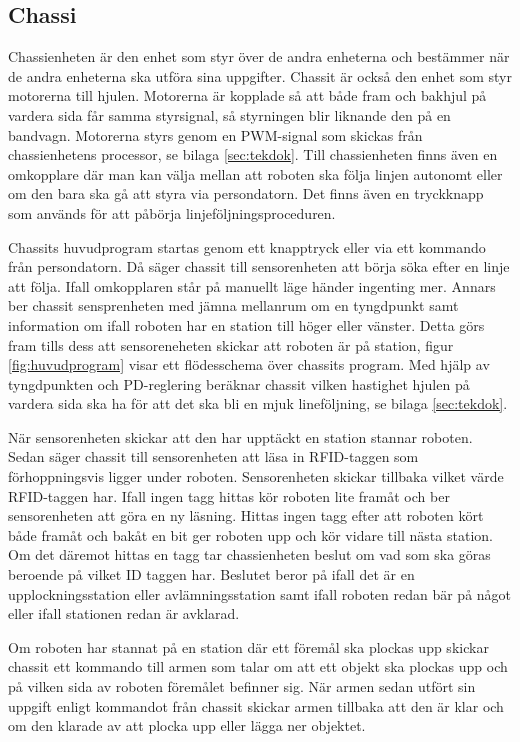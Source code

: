 
\subsection{Chassi}

Chassienheten är den enhet som styr över de andra enheterna och bestämmer när de andra enheterna ska utföra sina uppgifter. Chassit är också den enhet som styr motorerna till hjulen. Motorerna är kopplade så att både fram och bakhjul på vardera sida får samma styrsignal, så styrningen blir liknande den på en bandvagn. Motorerna styrs genom en PWM-signal som skickas från chassienhetens processor, se bilaga \ref{sec:tekdok}. Till chassienheten finns även en omkopplare där man kan välja mellan att roboten ska följa linjen autonomt eller om den bara ska gå att styra via persondatorn. Det finns även en tryckknapp som används för att påbörja linjeföljningsproceduren.

Chassits huvudprogram startas genom ett knapptryck eller via ett kommando från persondatorn. Då säger chassit till sensorenheten att börja söka efter en linje att följa. Ifall omkopplaren står på manuellt läge händer ingenting mer. Annars ber chassit sensprenheten med jämna mellanrum om en tyngdpunkt samt information om ifall roboten har en station till höger eller vänster. Detta görs fram tills dess att sensoreneheten skickar att roboten är på station, figur \ref{fig:huvudprogram} visar ett flödesschema över chassits program. Med hjälp av tyngdpunkten och PD-reglering beräknar chassit vilken hastighet hjulen på vardera sida ska ha för att det ska bli en mjuk lineföljning, se bilaga \ref{sec:tekdok}. 



När sensorenheten skickar att den har upptäckt en station stannar roboten. Sedan säger chassit till sensorenheten att läsa in RFID-taggen som förhoppningsvis ligger under roboten. Sensorenheten skickar tillbaka vilket värde RFID-taggen har. Ifall ingen tagg hittas kör roboten lite framåt och ber sensorenheten att göra en ny läsning. Hittas ingen tagg efter att roboten kört både framåt och bakåt en bit ger roboten upp och kör vidare till nästa station. Om det däremot hittas en tagg tar chassienheten beslut om vad som ska göras beroende på vilket ID taggen har. Beslutet beror på ifall det är en upplockningsstation eller avlämningsstation samt ifall roboten redan bär på något eller ifall stationen redan är avklarad. 

Om roboten har stannat på en station där ett föremål ska plockas upp skickar chassit ett kommando till armen som talar om att ett objekt ska plockas upp och på vilken sida av roboten föremålet befinner sig. När armen sedan utfört sin uppgift enligt kommandot från chassit skickar armen tillbaka att den är klar och om den klarade av att plocka upp eller lägga ner objektet. 

